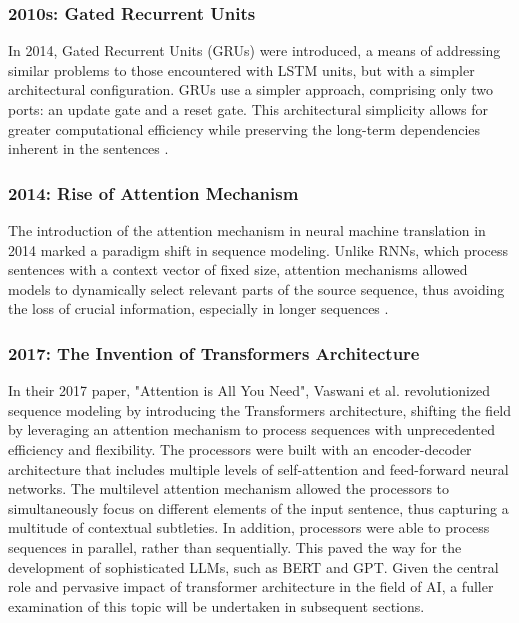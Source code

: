 \subsubsection{2010s: Gated Recurrent Units}

In 2014, Gated Recurrent Units (GRUs) were introduced, a means of addressing similar problems to those encountered with LSTM units, but with a simpler architectural configuration. GRUs use a simpler approach, comprising only two ports: an update gate and a reset gate. This architectural simplicity allows for greater computational efficiency while preserving the long-term dependencies inherent in the sentences \cite{cho2014learning}.

\subsubsection{2014: Rise of Attention Mechanism}

The introduction of the attention mechanism in neural machine translation in 2014 marked a paradigm shift in sequence modeling. Unlike RNNs, which process sentences with a context vector of fixed size, attention mechanisms allowed models to dynamically select relevant parts of the source sequence, thus avoiding the loss of crucial information, especially in longer sequences \cite{bahdanau2014neural}.

\subsubsection{2017: The Invention of Transformers Architecture}

In their 2017 paper, "Attention is All You Need", Vaswani et al. \cite{vaswani2017attention} revolutionized sequence modeling by introducing the Transformers architecture, shifting the field by leveraging an attention mechanism to process sequences with unprecedented efficiency and flexibility. The processors were built with an encoder-decoder architecture that includes multiple levels of self-attention and feed-forward neural networks. The multilevel attention mechanism allowed the processors to simultaneously focus on different elements of the input sentence, thus capturing a multitude of contextual subtleties. In addition, processors were able to process sequences in parallel, rather than sequentially. This paved the way for the development of sophisticated LLMs, such as BERT and GPT. Given the central role and pervasive impact of transformer architecture in the field of AI, a fuller examination of this topic will be undertaken in subsequent sections.

